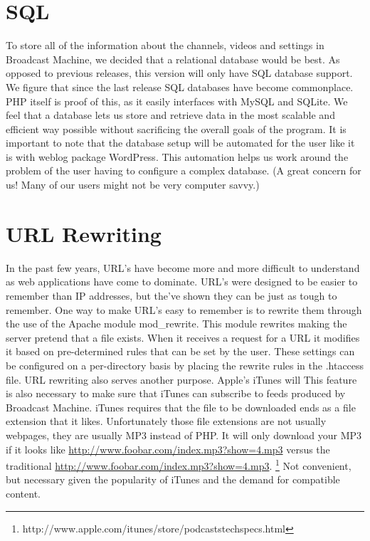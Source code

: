 \documentclass[a4paper,12pt]{report}
\begin{document}
\section{SQL}
To store all of the information about the channels, videos and settings in Broadcast Machine, we decided that a relational database would be best. 
As opposed to previous releases, this version will only have SQL database support.
We figure that since the last release SQL databases have become commonplace.
PHP itself is proof of this, as it easily interfaces with MySQL and SQLite.
We feel that a database lets us store and retrieve data in the most scalable and efficient way possible without sacrificing the overall goals of the program.
It is important to note that the database setup will be automated for the user like it is with weblog package WordPress.
This automation helps us work around the problem of the user having to configure a complex database. (A great concern for us! Many of our users might not be very computer savvy.)


\section{URL Rewriting}
In the past few years, URL's have become more and more difficult to understand as web applications have come to dominate.
URL's were designed to be easier to remember than IP addresses, but the've shown they can be just as tough to remember.
One way to make URL's easy to remember is to rewrite them through the use of the Apache module mod\_rewrite.
This module rewrites making the server pretend that a file exists.
When it receives a request for a URL it modifies it based on pre-determined rules that can be set by the user.
These settings can be configured on a per-directory basis by placing the rewrite rules in the .htaccess file.
URL rewriting also serves another purpose.
Apple's iTunes will 
This feature is also necessary to make sure that iTunes can subscribe to feeds produced by Broadcast Machine.
iTunes requires that the file to be downloaded ends as a file extension that it likes.
Unfortunately those file extensions are not usually webpages, they are usually MP3 instead of PHP.
It will only download your MP3 if it looks like \url{http://www.foobar.com/index.mp3?show=4.mp3} versus the traditional \url{http://www.foobar.com/index.mp3?show=4.mp3}. \footnote{http://www.apple.com/itunes/store/podcaststechspecs.html}
Not convenient, but necessary given the popularity of iTunes and the demand for compatible content.
\end{document}
